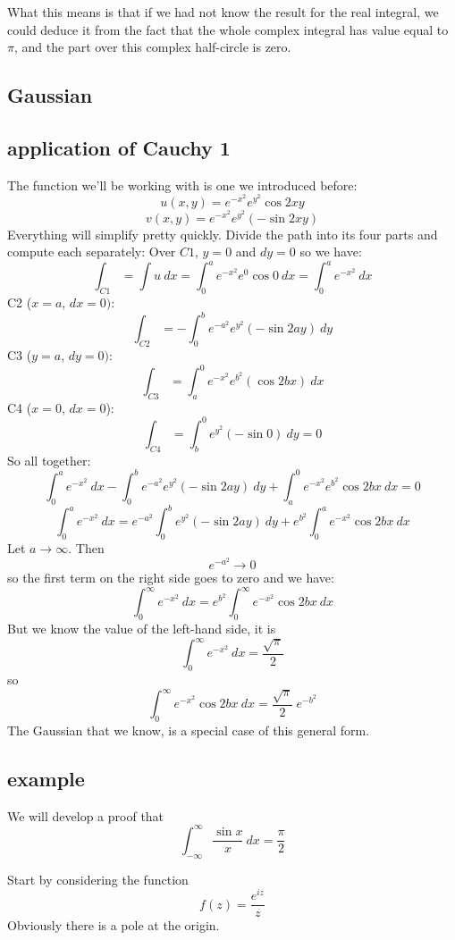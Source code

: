\documentclass[11pt, oneside]{article}   	%
\begin{document}
What this means is that if we had not know the result for the real integral, we could deduce it from the fact that the whole complex integral has value equal to $\pi$, and the part over this complex half-circle is zero.

\subsection*{Gaussian}

\subsection*{application of Cauchy 1}

The function we'll be working with is one we introduced before:
\[ u(x,y) =  e^{-x^2} e^{y^2} \cos 2xy \]
\[ v(x,y) = e^{-x^2} e^{y^2} (- \sin 2xy) \]
Everything will simplify pretty quickly.  Divide the path into its four parts and compute each separately:
Over $C1$, $y=0$ and $dy = 0$ so we have:
\[ \int_{C1} = \int u \ dx = \int_0^a e^{-x^2} e^{0} \cos 0 \ dx = \int_0^a e^{-x^2} \ dx \]
C2 ($x = a$, $dx = 0)$:
\[ \int_{C2} = - \int_0^b e^{-a^2} e^{y^2} (- \sin 2ay) \ dy  \]
C3 ($y = a$, $dy = 0)$:
\[ \int_{C3} = \int_a^0 e^{-x^2} e^{b^2} (\cos 2bx) \ dx  \]
C4 ($x = 0$, $dx = 0$):
\[ \int_{C4} = \int_b^0 e^{y^2} (-\sin 0) \ dy = 0 \]
So all together:
\[ \int_0^a e^{-x^2} \ dx - \int_0^b e^{-a^2} e^{y^2} (- \sin 2ay) \ dy + \int_a^0 e^{-x^2} e^{b^2} \cos 2bx \ dx = 0 \]
\[ \int_0^a e^{-x^2} \ dx = e^{-a^2} \int_0^b e^{y^2} (- \sin 2ay) \ dy + e^{b^2} \int_0^a e^{-x^2} \cos 2bx \ dx  \]
Let $a \rightarrow \infty$.  Then
\[ e^{-a^2} \rightarrow 0 \]
so the first term on the right side goes to zero and we have:
\[ \int_0^{\infty} e^{-x^2} \ dx = e^{b^2} \int_0^{\infty} e^{-x^2} \cos 2bx \ dx  \]
But we know the value of the left-hand side, it is 
\[ \int_0^{\infty} e^{-x^2} \ dx = \frac{\sqrt{\pi}}{2} \]
so
\[  \int_0^{\infty} e^{-x^2} \cos 2bx \ dx = \frac{\sqrt{\pi}}{2} \ e^{-b^2} \]
The Gaussian that we know, is a special case of this general form.

\subsection*{example}
We will develop a proof that
\[ \int_{-\infty}^{\infty} \frac{\sin x}{x} \ dx = \frac{\pi}{2} \]

Start by considering the function 
\[ f(z) = \frac{e^{iz}}{z} \]
Obviously there is a pole at the origin.
\end{document}
